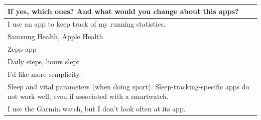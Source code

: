 \documentclass{article}
\begin{document}
\begin{table}[H]
	\centering
	\begin{tabularx}{0.9\textwidth}{X}
		\hline
		\textbf{If yes, which ones? And what would you change about this apps?}                                                                                                                                                                                                    \\
		\hline
		I use an app to keep track of my running statistics.                                                                                                                                                                                                                       \\
		\hline
		Samsung Health, Apple Health                                                                                                                                                                                                                                               \\
		\hline
		Zepp app                                                                                                                                                                                                                                                                   \\
		\hline
		Daily steps, hours slept                                                                                                                                                                                                                                                   \\
		\hline
		I'd like more semplicity.                                                                                                                                                                                                                                                  \\
		\hline
		Sleep and vital parameters (when doing sport). Sleep-tracking-specific apps do not work well, even if associated with a smartwatch.                                                                                                                                        \\
		\hline
		I use the Garmin watch, but I don't look often at its app.                                                                                                                                                                                                                 \\

\end{tabularx}
\end{table}
\end{document}
